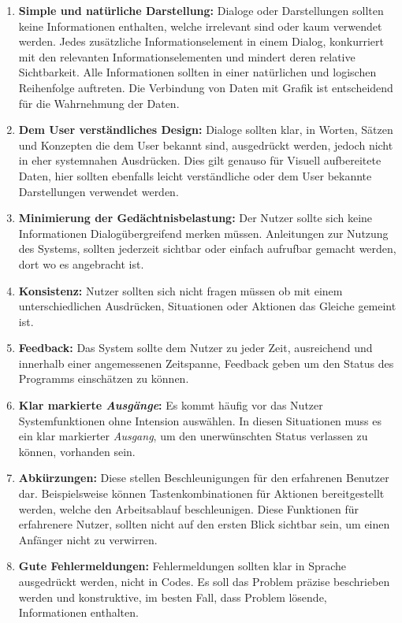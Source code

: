 \documentclass[draft=false
              ,paper=a4
              ,twoside=false
              ,fontsize=11pt
              ,headsepline
              ,BCOR10mm
              ,DIV11
              ]{scrbook}
\begin{document}
\begin{enumerate}
  \item \textbf{Simple und natürliche Darstellung:} Dialoge oder Darstellungen sollten keine Informationen enthalten, welche irrelevant sind oder kaum verwendet werden. Jedes zusätzliche Informationselement in einem Dialog, konkurriert mit den relevanten Informationselementen und mindert deren relative Sichtbarkeit. Alle Informationen sollten in einer natürlichen und logischen Reihenfolge auftreten. Die Verbindung von Daten mit Grafik ist entscheidend für die Wahrnehmung der Daten.
  \item \textbf{Dem User verständliches Design:} Dialoge sollten klar, in Worten, Sätzen und Konzepten die dem User bekannt sind, ausgedrückt werden, jedoch nicht in eher systemnahen Ausdrücken. Dies gilt genauso für Visuell aufbereitete Daten, hier sollten ebenfalls leicht verständliche oder dem User bekannte Darstellungen verwendet werden.
  \item \textbf{Minimierung der Gedächtnisbelastung:} Der Nutzer sollte sich keine Informationen Dialogübergreifend merken müssen. Anleitungen zur Nutzung des Systems, sollten jederzeit sichtbar oder einfach aufrufbar gemacht werden, dort wo es angebracht ist.
  \item \textbf{Konsistenz:} Nutzer sollten sich nicht fragen müssen ob mit einem unterschiedlichen Ausdrücken, Situationen oder Aktionen das Gleiche gemeint ist. 
  \item \textbf{Feedback:} Das System sollte dem Nutzer zu jeder Zeit, ausreichend und innerhalb einer angemessenen Zeitspanne, Feedback geben um den Status des Programms einschätzen zu können. 
  \item \textbf{Klar markierte \textit{Ausgänge}:} Es kommt häufig vor das Nutzer Systemfunktionen ohne Intension auswählen. In diesen Situationen muss es ein klar markierter \textit{Ausgang}, um den unerwünschten Status verlassen zu können, vorhanden sein. 
  \item \textbf{Abkürzungen:} Diese stellen Beschleunigungen für den erfahrenen Benutzer dar. Beispielsweise können Tastenkombinationen für Aktionen bereitgestellt werden, welche den Arbeitsablauf beschleunigen.  Diese Funktionen für erfahrenere Nutzer, sollten nicht auf den ersten Blick sichtbar sein, um einen Anfänger nicht zu verwirren.
  \item \textbf{Gute Fehlermeldungen:} Fehlermeldungen sollten klar in Sprache ausgedrückt werden, nicht in Codes. Es soll das Problem präzise beschrieben werden und konstruktive, im besten Fall, dass Problem lösende, Informationen enthalten.

\end{enumerate}
\end{document}
